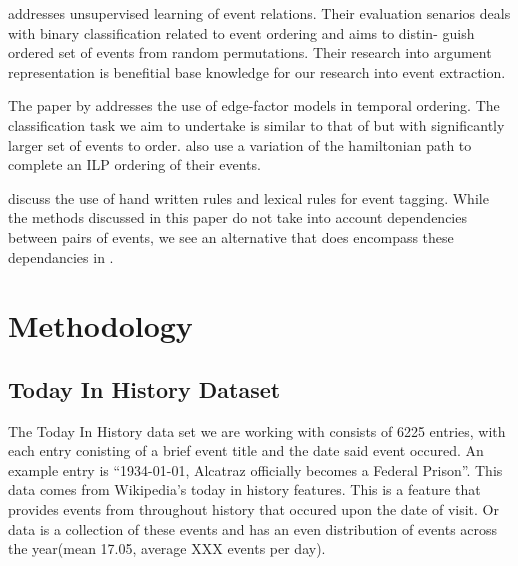 \documentclass[bsc,frontabs,twoside,singlespacing,parskip,deptreport]{infthesis}     %
\begin{document}
\cite{chambers2009unsupervised}addresses unsupervised learning of event relations. Their evaluation
senarios deals with binary classification related to event ordering and aims to distin-
guish ordered set of events from random permutations. Their research into argument representation is benefitial base
knowledge for our research into event extraction.

The paper by \cite{abend2015lexical} addresses the use of
edge-factor models in temporal ordering. The classification task we aim to undertake is similar to that of \cite{abend2015lexical}
but with significantly larger set of events to order. \cite{abend2015lexical} also use a variation of the hamiltonian path
to complete an ILP ordering of their events.

\cite{mani2006machine} discuss the use of hand written rules and lexical rules for event tagging. While the methods discussed in this paper
do not take into account dependencies between pairs of events, we see an alternative that does encompass
these dependancies in \cite{schapire1998learning}.  


\chapter{Methodology}


\section{Today In History Dataset}
The Today In History data set we are working with consists of 6225 entries, with each entry conisting
of a  brief event title and the date said event occured.
An example entry is ``1934-01-01, Alcatraz officially becomes a Federal Prison''.
This data comes from Wikipedia's today in history features. This is a feature that provides events from
throughout history that occured upon the date of visit. Or data is a collection of these events and has
an even distribution of events across the year(mean 17.05, average XXX events per day).
\end{document}
